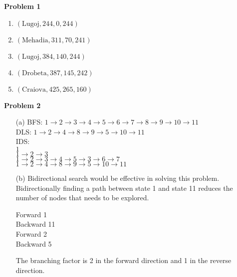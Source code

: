 \documentclass[11pt]{article}
\begin{document}
    \begin{center}
        \Large
        \textbf{Problem 1}
    \end{center}
    \normalsize
    \begin{enumerate}
        \item $\left(\text{Lugoj}, 244, 0, 244\right)$
        \item $\left(\text{Mehadia}, 311, 70, 241\right)$
        \item $\left(\text{Lugoj}, 384, 140, 244\right)$
        \item $\left(\text{Drobeta}, 387, 145, 242\right)$
        \item $\left(\text{Craiova}, 425, 265, 160\right)$
    \end{enumerate}
    \begin{center}
        \Large
        \textbf{Problem 2}
    \end{center}
    \normalsize
    \begin{enumerate}
        \item[(a)] %
          BFS: $1 \rightarrow 2 \rightarrow 3\rightarrow 4 \rightarrow 5 \rightarrow 6 \rightarrow 7 \rightarrow 8 \rightarrow9\rightarrow10\rightarrow11$\\
          DLS: $1\rightarrow2\rightarrow4\rightarrow8\rightarrow9\rightarrow5\rightarrow10\rightarrow11$\\
          IDS: \\
          $1$\\
          $1\rightarrow2\rightarrow3$\\
          $1\rightarrow2\rightarrow3\rightarrow4\rightarrow5\rightarrow3\rightarrow6\rightarrow7$\\
          $1\rightarrow2\rightarrow4\rightarrow8\rightarrow9\rightarrow5\rightarrow10\rightarrow11$
        
        \item[(b)] %
        Bidirectional search would be effective in solving this problem. Bidirectionally finding a path between state 1 and state 11 reduces the number of nodes that needs to be explored.
        
        Forward   1\\
        Backward  11\\
        Forward   2\\
        Backward  5
        
        The branching factor is 2 in the forward direction and 1 in the reverse direction.
        
    \end{enumerate}
\end{document}
